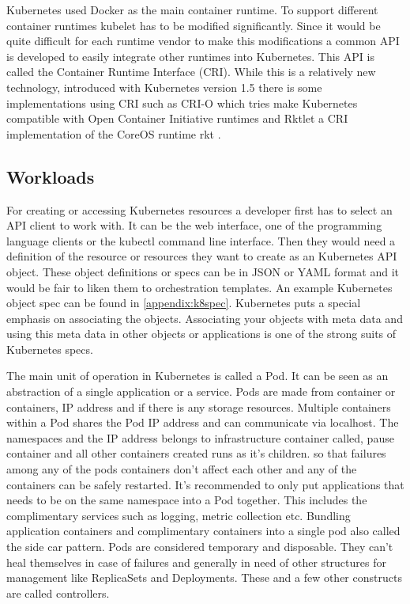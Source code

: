 \documentclass[12pt,oneandhalf,chaparabic,ceng,ms,eng,oneside,pntc]{gsufbe}
\begin{document}
Kubernetes used Docker as the main container runtime.  To support different container runtimes kubelet
has to be modified significantly.  Since it would be quite difficult for each runtime vendor to make
this modifications a common API is developed to easily integrate other runtimes into Kubernetes.  This
API is called the Container Runtime Interface (CRI).  While this is a relatively new technology,
introduced with Kubernetes version 1.5 there is some implementations using CRI such as CRI-O \cite{crio} which
tries make Kubernetes compatible with Open Container Initiative runtimes and Rktlet a CRI
implementation of the CoreOS runtime rkt \cite{rkt}.

\subsection{Workloads}
For creating or accessing Kubernetes resources a developer first has to select an API client to work
with.  It can be the web interface, one of the programming language clients or the kubectl command line
interface.  Then they would need a definition of the resource or resources they want to create as an
Kubernetes API object.  These object definitions or specs can be in JSON or YAML format and it would be
fair to liken them to orchestration templates.  An example Kubernetes object spec can be found in
\ref{appendix:k8spec}.  Kubernetes puts a special emphasis on associating the objects.  Associating your
objects with meta data and using this meta data in other objects or applications is one of the strong
suits of Kubernetes specs.

The main unit of operation in Kubernetes is called a Pod.  It can be seen as an abstraction of a single
application or a service.  Pods are made from container or containers, IP address and if there is any
storage resources.  Multiple containers within a Pod shares the Pod IP address and can communicate via
localhost.  The namespaces and the IP address belongs to infrastructure container called, pause 
container and all other containers created runs as it’s children.  so that failures among any of the 
pods containers don't affect each other and any of the containers can be safely restarted.  
\cite{sayfan_mastering_2018} It's 
recommended to only put applications that needs to be on the same namespace into a Pod together.  This
includes the complimentary services such as logging, metric collection etc. Bundling application
containers and complimentary containers into a single pod also called the side car pattern.  Pods are
considered temporary and disposable.  They can’t heal themselves in case of failures and generally in
need of other structures for management like ReplicaSets and Deployments.  These and a few other
constructs are called controllers.
\end{document}
